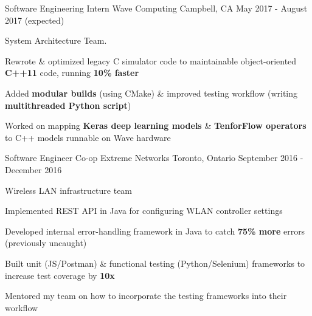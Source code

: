 


\begin{cventries}


\cventry
{Software Engineering Intern}
{Wave Computing}
{Campbell, CA}
{May 2017 - August 2017 (expected)}
{ %
System Architecture Team.
\begin{cvitems}
\item[]
\item {Rewrote \& optimized legacy C simulator code to maintainable object-oriented \textbf{C++11} code, running \textbf{10\% faster}}
\item {Added \textbf{modular builds} (using CMake) \& improved testing workflow (writing \textbf{multithreaded Python script})}
\item {Worked on mapping \textbf{Keras deep learning models} \& \textbf{TenforFlow operators} to C++ models runnable on Wave hardware}
\end{cvitems}
}


\cventry
{Software Engineer Co-op}
{Extreme Networks}
{Toronto, Ontario}
{September 2016 - December 2016}
{ %
Wireless LAN infrastructure team
\begin{cvitems}
\item[]
\item {Implemented REST API in Java for configuring WLAN controller settings}
\item {Developed internal error-handling framework in Java to catch \textbf{75\% more} errors (previously uncaught)}
\item {Built unit (JS/Postman) \& functional testing (Python/Selenium) frameworks to increase test coverage by \textbf{10x}}
\item {Mentored my team on how to incorporate the testing frameworks into their workflow}
\end{cvitems}
}


\end{cventries}
